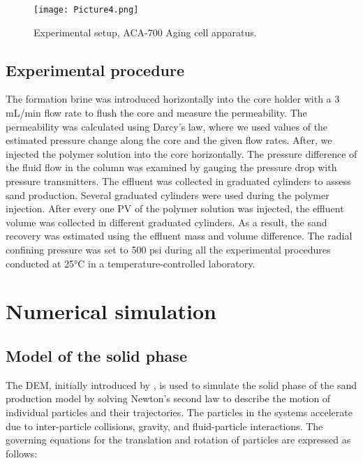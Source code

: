 \documentclass{article}
\begin{document}
\begin{figure}[H]
\begin{centering}
\texttt{[image: Picture4.png]}
\par\end{centering}
\caption{Experimental setup, ACA-700 Aging cell apparatus.\label{fig:aging_cell}}
\end{figure}

\subsection{Experimental procedure}

The formation brine was introduced horizontally into the core holder with a 3 mL/min flow rate to flush the core and measure the permeability. The permeability was calculated using Darcy's law, where we used values of the estimated pressure change along the core and the given flow rates.  
After, we injected the polymer solution into the core horizontally. The pressure difference of the fluid flow in the column was examined by gauging the pressure drop with pressure transmitters. The effluent was collected in graduated cylinders to assess sand production. Several graduated cylinders were used during the polymer injection. After every one PV of the polymer solution was injected, the effluent volume was collected in different graduated cylinders. As a result, the sand recovery was estimated using the effluent mass and volume difference. The radial confining pressure was set to 500 psi during all the experimental procedures conducted at 25°C in a temperature-controlled laboratory.


\section{Numerical simulation}
\label{sec:numerical}

\subsection{Model of the solid phase}

The DEM, initially introduced by \cite{cundall1979discrete}, is used to simulate the solid phase of the sand production model by solving Newton’s second law to describe the motion of individual particles and their trajectories. The particles in the systems accelerate due to inter-particle collisions, gravity, and fluid-particle interactions. The governing equations for the translation and rotation of particles are expressed as follows:
\end{document}

